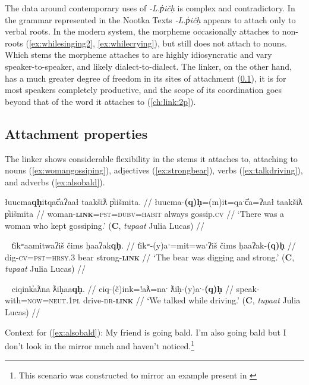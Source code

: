 The data around contemporary uses of \textit{-L.p̓ičḥ} is complex and contradictory. In the grammar represented in the Nootka Texts \citep{sapir1939} \textit{-L.p̓ičḥ} appears to attach only to verbal roots. In the modern system, the morpheme occasionally attaches to non-roots (\ref{ex:whilesinging2}, \ref{ex:whilecrying}), but still does not attach to nouns. Which stems the morpheme attaches to are highly idiosyncratic and vary speaker-to-speaker, and likely dialect-to-dialect. The linker, on the other hand, has a much greater degree of freedom in its sites of attachment (\ref{ch:link:attach}), it is for most speakers completely productive, and the scope of its coordination goes beyond that of the word it attaches to (\ref{ch:link:2p}).

\subsection{Attachment properties} \label{ch:link:attach}

The linker shows considerable flexibility in the stems it attaches to, attaching to nouns (\ref{ex:womangossiping}), adjectives (\ref{ex:strongbear}), verbs (\ref{ex:talkdriving}), and adverbs (\ref{ex:alsobald}).

\ex \label{ex:womangossiping}
\begingl
\glpreamble łuucma\textbf{qḥ}itqač̓aʔaał taakšiƛ p̓iišmita. //
\gla łuucma-\textbf{(q)ḥ}=(m)it=qaˑč̓a=ʔaał taakšiƛ p̓iišmita //
\glb woman-\textbf{\textsc{link}}=\textsc{pst}=\textsc{dubv}=\textsc{habit} always gossip.\textsc{cv} //
\glft `There was a woman who kept gossiping.' (\textbf{C}, \textit{tupaat} Julia Lucas) //
\endgl
\xe

\ex~ \label{ex:strongbear}
\begingl
\glpreamble t̓ikʷaamitwaʔiš čims ḥaaʔak\textbf{qḥ}. //
\gla t̓ikʷ-(y)aˑ=mit=waˑʔiš čims ḥaaʔak-\textbf{(q)ḥ} //
\glb dig-\textsc{cv}=\textsc{pst}=\textsc{hrsy.3} bear strong-\textbf{\textsc{link}} //
\glft `The bear was digging and strong.' (\textbf{C}, \textit{tupaat} Julia Lucas) //
\endgl
\xe

\ex~ \label{ex:talkdriving}
\begingl
\glpreamble ciqink̓aƛna ƛiḥaa\textbf{qḥ}. //
\gla ciq-(č)ink=!aƛ=naˑ ƛiḥ-(y)aˑ-\textbf{(q)ḥ} //
\glb speak-with=\textsc{now}=\textsc{neut.1pl} drive-\textsc{dr}-\textbf{\textsc{link}} //
\glft `We talked while driving.' (\textbf{C}, \textit{tupaat} Julia Lucas) //
\endgl
\xe

\noindent Context for (\ref{ex:alsobald}): My friend is going bald. I'm also going bald but I don't look in the mirror much and haven't noticed.\footnote{This scenario was constructed to mirror an example present in \cite{sapir1939}}


